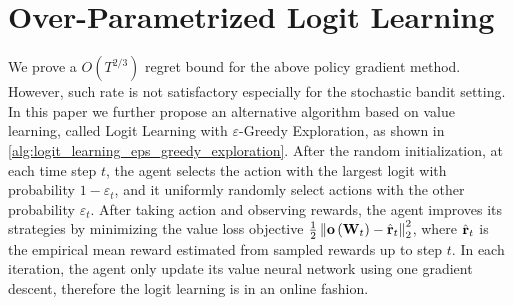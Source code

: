 \section{Over-Parametrized Logit Learning}
\label{sec:logit_learning}

We prove a $O(T^{2/3})$ regret bound for the above policy gradient method.
However, such rate is not satisfactory especially for the stochastic bandit setting. In this paper we further propose an alternative algorithm based on value learning, called Logit Learning with $\varepsilon$-Greedy Exploration, as shown in \cref{alg:logit_learning_eps_greedy_exploration}. After the random initialization, at each time step $t$, the agent selects the action with the largest logit with probability $1 - \varepsilon_t$, and it uniformly randomly select actions with the other probability $\varepsilon_t$. After taking action and observing rewards, the agent improves its strategies by minimizing the value loss objective $\frac{1}{2} \left\| {\mathbf{o}}\left( {\mathbf{W}}_t\right) - \hat{{\mathbf{r}}}_t \right\|_2^2$, where $\hat{{\mathbf{r}}}_t$ is the empirical mean reward estimated from sampled rewards up to step $t$. In each iteration, the agent only update its value neural network using one gradient descent, therefore the logit learning is in an online fashion.

